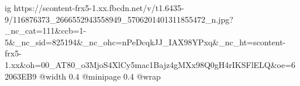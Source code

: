  
 
 
 
 

\ifcmt
  ig https://scontent-frx5-1.xx.fbcdn.net/v/t1.6435-9/116876373_2666552943558949_5706201401311855472_n.jpg?_nc_cat=111&ccb=1-5&_nc_sid=825194&_nc_ohc=nPeDcqkJJ_IAX98YPxq&_nc_ht=scontent-frx5-1.xx&oh=00_AT80_o3MjoS4XlCy5mac1Bajz4gMXx98Q0gH4rIKSFlELQ&oe=62063EB9
  @width 0.4
  @minipage 0.4
  @wrap \parpic[r]
\fi
